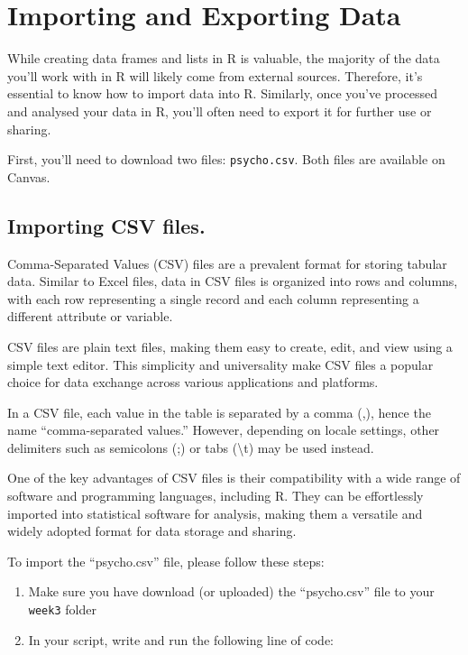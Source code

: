 \documentclass[
]{book}
\begin{document}
\section{Importing and Exporting Data}\label{importing}

While creating data frames and lists in R is valuable, the majority of the data you'll work with in R will likely come from external sources. Therefore, it's essential to know how to import data into R. Similarly, once you've processed and analysed your data in R, you'll often need to export it for further use or sharing.

First, you'll need to download two files: \texttt{psycho.csv}. Both files are available on Canvas.

\subsection{Importing CSV files.}\label{importing-csv-files.}

Comma-Separated Values (CSV) files are a prevalent format for storing tabular data. Similar to Excel files, data in CSV files is organized into rows and columns, with each row representing a single record and each column representing a different attribute or variable.

CSV files are plain text files, making them easy to create, edit, and view using a simple text editor. This simplicity and universality make CSV files a popular choice for data exchange across various applications and platforms.

In a CSV file, each value in the table is separated by a comma (,), hence the name ``comma-separated values.'' However, depending on locale settings, other delimiters such as semicolons (;) or tabs (\textbackslash t) may be used instead.

One of the key advantages of CSV files is their compatibility with a wide range of software and programming languages, including R. They can be effortlessly imported into statistical software for analysis, making them a versatile and widely adopted format for data storage and sharing.

To import the ``psycho.csv'' file, please follow these steps:

\begin{enumerate}
\def\labelenumi{\arabic{enumi}.}
\item
  Make sure you have download (or uploaded) the ``psycho.csv'' file to your \texttt{week3} folder
\item
  In your script, write and run the following line of code:
\end{enumerate}
\end{document}
